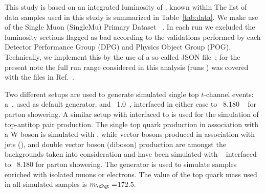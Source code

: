 This study is based on an integrated luminosity of \mylumi, known within \lumiunc %
The list of data samples used in this study is summarized in Table~\ref{tab:data}. We make use of the Single Muon (SingleMu) Primary Dataset ~\cite{sd}. In each run we excluded the luminosity sections flagged as bad according to the validations performed by each Detector Performance Group (DPG) and Physics Object Group (POG). Technically, we implement this by the use of a so called JSON file~\cite{json}; for the present note the full run range considered in this analysis (runs \runrange) was covered with the files in Ref.~\cite{json2}.

Two different setups are used to generate simulated single top $t$-channel events: a\MCATNLO ~\cite{amcatnlo}, used as default generator, and \POWHEG~1.0~\cite{Re:2010bp,Alioli:2010xd,Alioli:2009je,Frixione:2007vw}, interfaced in either case to {\PYTHIA~8.180} ~\cite{Sjostrand:2006za} for parton showering. 
A similar setup with {\MADGRAPH} interfaced to \PYTHIA is used for the simulation of top-antitop pair production.
The single top quark production in association with a W boson is simulated with \POWHEG, while vector bosons produced in association with jets (\vjets), and double vector boson (diboson) production are amongst the backgrounds taken into consideration and have been
simulated with {\MADGRAPH}~\cite{madgraph} interfaced to \PYTHIA~8.180 for parton showering.
The \PYTHIA generator is used to simulate \QCD samples enriched with isolated muons or electrons.
The value of the top quark mass used in all simulated samples is $m_{\cPqt}=$172.5\GeV.



